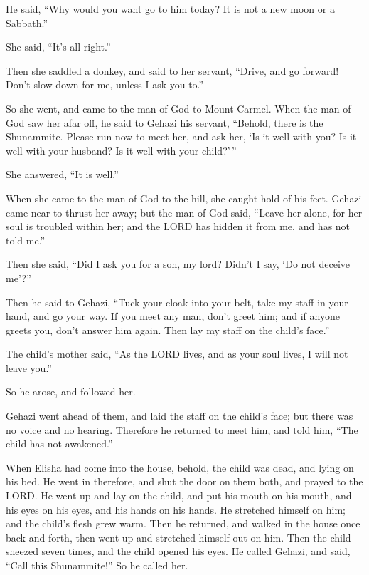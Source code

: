  He said, ``Why would you want go to him today? It is not a
new moon or a Sabbath.''

She said, ``It's all right.''

 Then she saddled a donkey, and said to her servant,
``Drive, and go forward! Don't slow down for me, unless I ask you to.''

 So she went, and came to the man of God to Mount Carmel.
When the man of God saw her afar off, he said to Gehazi his servant,
``Behold, there is the Shunammite.  Please run now to meet
her, and ask her, `Is it well with you? Is it well with your husband? Is
it well with your child?'\,''

She answered, ``It is well.''

 When she came to the man of God to the hill, she caught
hold of his feet. Gehazi came near to thrust her away; but the man of
God said, ``Leave her alone, for her soul is troubled within her; and
the LORD has hidden it from me, and has not told me.''

 Then she said, ``Did I ask you for a son, my lord? Didn't
I say, `Do not deceive me'?''

 Then he said to Gehazi, ``Tuck your cloak into your belt,
take my staff in your hand, and go your way. If you meet any man, don't
greet him; and if anyone greets you, don't answer him again. Then lay my
staff on the child's face.''

 The child's mother said, ``As the LORD lives, and as your
soul lives, I will not leave you.''

So he arose, and followed her.

 Gehazi went ahead of them, and laid the staff on the
child's face; but there was no voice and no hearing. Therefore he
returned to meet him, and told him, ``The child has not awakened.''

 When Elisha had come into the house, behold, the child was
dead, and lying on his bed.  He went in therefore, and shut
the door on them both, and prayed to the LORD.  He went up
and lay on the child, and put his mouth on his mouth, and his eyes on
his eyes, and his hands on his hands. He stretched himself on him; and
the child's flesh grew warm.  Then he returned, and walked
in the house once back and forth, then went up and stretched himself out
on him. Then the child sneezed seven times, and the child opened his
eyes.  He called Gehazi, and said, ``Call this
Shunammite!'' So he called her.

